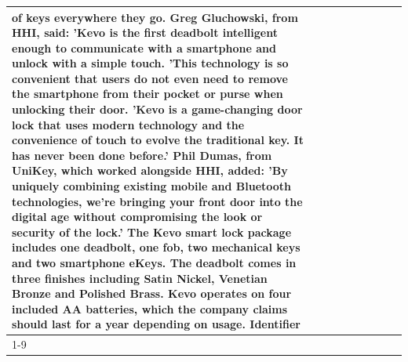\begin{table}[H]
\begin{tabular}{lllrlllll}
of keys everywhere they go. Greg Gluchowski, from HHI, said: 'Kevo is the first deadbolt intelligent enough to communicate with a smartphone and unlock with a simple touch. 'This technology is so convenient that users do not even need to remove the smartphone from their pocket or purse when unlocking their door. 'Kevo is a game-changing door lock that uses modern technology and the convenience of touch to evolve the traditional key. It has never been done before.' Phil Dumas, from UniKey, which worked alongside HHI, added: 'By uniquely combining existing mobile and Bluetooth technologies, we’re bringing your front door into the digital age without compromising the look or security of the lock.' The Kevo smart lock package includes one deadbolt, one fob, two mechanical keys and two smartphone eKeys. The deadbolt comes in three finishes including Satin Nickel, Venetian Bronze and Polished Brass. Kevo operates on four included AA batteries, which the company claims should last for a year depending on usage. Identifier \\
\cline{1-9}

\end{tabular}
\end{table}
